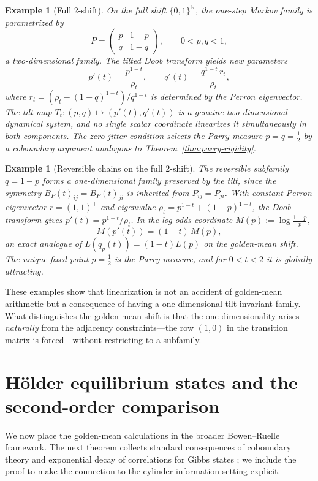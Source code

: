 \documentclass[pdflatex,sn-basic,Numbered]{sn-jnl}
\theoremstyle{thmstyleone}
\theoremstyle{thmstyletwo}
\newtheorem{example}[theorem]{Example}
\theoremstyle{thmstylethree}
\newcommand{\NN}{\mathbb{N}}
\begin{document}
\begin{example}[Full 2-shift]\label{ex:full-shift}
On the full shift $\{0,1\}^\NN$, the one-step Markov family is parametrized by
\[
P=\begin{pmatrix}p & 1-p\\q & 1-q\end{pmatrix},
\qquad 0<p,q<1,
\]
a two-dimensional family. The tilted Doob transform yields new parameters
\[
p'(t)=\frac{p^{1-t}}{\rho_t},
\qquad
q'(t)=\frac{q^{1-t}\,r_t}{\rho_t},
\]
where $r_t=(\rho_t-(1-q)^{1-t})/q^{1-t}$ is determined by the Perron eigenvector. The tilt map $T_t:(p,q)\mapsto (p'(t),q'(t))$ is a genuine two-dimensional dynamical system, and no single scalar coordinate linearizes it simultaneously in both components. The zero-jitter condition selects the Parry measure $p=q=\tfrac{1}{2}$ by a coboundary argument analogous to Theorem~\ref{thm:parry-rigidity}.
\end{example}

\begin{example}[Reversible chains on the full 2-shift]\label{ex:reversible}
The reversible subfamily $q=1-p$ forms a one-dimensional family preserved by the tilt, since the symmetry $B_P(t)_{ij}=B_P(t)_{ji}$ is inherited from $P_{ij}=P_{ji}$. With constant Perron eigenvector $r=(1,1)^\top$ and eigenvalue $\rho_t=p^{1-t}+(1-p)^{1-t}$, the Doob transform gives $p'(t)=p^{1-t}/\rho_t$. In the log-odds coordinate $M(p):=\log\frac{1-p}{p}$,
\[
M(p'(t))=(1-t)\,M(p),
\]
an exact analogue of $L(q_p(t))=(1-t)L(p)$ on the golden-mean shift. The unique fixed point $p=\tfrac{1}{2}$ is the Parry measure, and for $0<t<2$ it is globally attracting.
\end{example}

These examples show that linearization is not an accident of golden-mean arithmetic but a consequence of having a one-dimensional tilt-invariant family. What distinguishes the golden-mean shift is that the one-dimensionality arises \emph{naturally} from the adjacency constraints---the row $(1,0)$ in the transition matrix is forced---without restricting to a subfamily.

\section{H\"older equilibrium states and the second-order comparison}

We now place the golden-mean calculations in the broader Bowen--Ruelle framework. The next theorem collects standard consequences of coboundary theory \cite{Bowen1975,Ruelle1978,ParryPollicott1990} and exponential decay of correlations for Gibbs states \cite{Baladi2000}; we include the proof to make the connection to the cylinder-information setting explicit.
\end{document}
